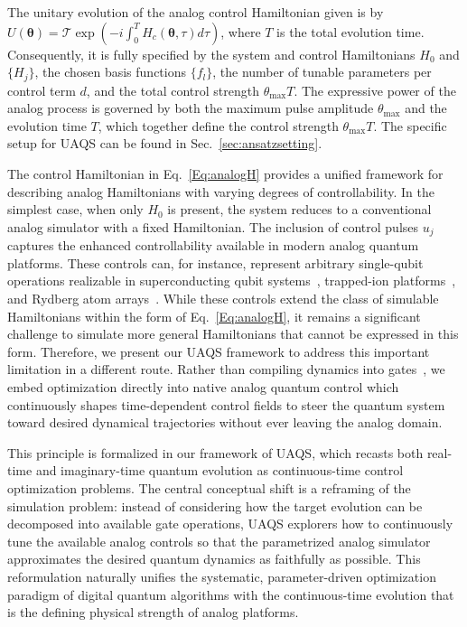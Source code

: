 \documentclass[twocolumn,
pra,aps,superscriptaddress,showpacs,amsmath,amssymb]{revtex4-2}
\begin{document}
The unitary evolution of the analog control Hamiltonian given is by $U(\bm{\theta})=\mathcal{T}\exp(-i\int_0^T H_c(\bm{\theta},\tau)d\tau)$, where $T$ is the total evolution time. 
Consequently, it is fully specified by the system and control Hamiltonians $H_0$ and $\{H_j\}$, the chosen basis functions $\{f_l\}$, the number of tunable parameters per control term $d$, and the total control strength $\theta_{\max} T$. 
The expressive power of the analog process is governed by both the maximum pulse amplitude $\theta_{\max}$ and the evolution time $T$, which together define the control strength $\theta_{\max}T$. The specific setup for UAQS can be found in Sec.~\ref{sec:ansatzsetting}.


The control Hamiltonian in Eq.~\eqref{Eq:analogH} provides a unified framework for describing analog Hamiltonians with varying degrees of controllability. In the simplest case, when only $H_0$ is present, the system reduces to a conventional analog simulator with a fixed Hamiltonian. The inclusion of control pulses $u_j$ captures the enhanced controllability available in modern analog quantum platforms. These controls can, for instance, represent arbitrary single-qubit operations realizable in superconducting qubit systems~\cite{kjaergaard2019superconducting,mezzacapo2014digital,garcia2015fermion,asaad2016independent,weber2017coherent}, trapped-ion platforms~\cite{zhang2017observation,haffner2005scalable,blatt2012quantum}, and Rydberg atom arrays~\cite{saffman2016quantum}. While these controls extend the class of simulable Hamiltonians within the form of Eq.~\eqref{Eq:analogH}, it remains a significant challenge to simulate more general Hamiltonians that cannot be expressed in this form.
Therefore, we present our UAQS framework to address this important limitation in a different route. Rather than compiling dynamics into gates~\cite{li2017efficient,cirstoiu2020variational,yao2021adaptive,heya2023subspace}, we embed optimization directly into native analog quantum control which continuously shapes time-dependent control fields to steer the quantum system toward desired dynamical trajectories without ever leaving the analog domain.

This principle is formalized in our framework of UAQS, which recasts both real-time and imaginary-time quantum evolution as continuous-time control optimization problems. The central conceptual shift is a reframing of the simulation problem: instead of considering how the target evolution can be decomposed into available gate operations, UAQS explorers how to continuously tune the available analog controls so that the parametrized analog simulator approximates the desired quantum dynamics as faithfully as possible. This reformulation naturally unifies the systematic, parameter-driven optimization paradigm of digital quantum algorithms with the continuous-time evolution that is the defining physical strength of analog platforms.
\end{document}
